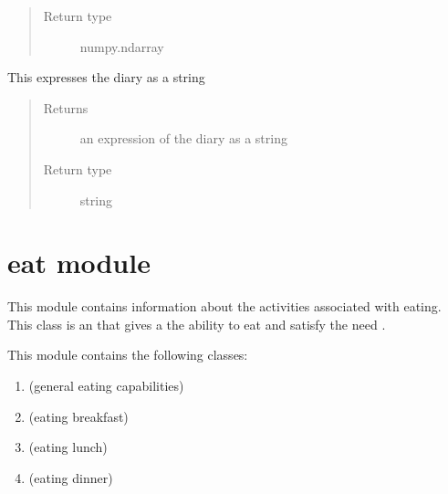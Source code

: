 \documentclass[letterpaper,10pt,english]{sphinxmanual}
\begin{document}
\begin{fulllineitems}
\begin{fulllineitems}
\begin{quote}
\begin{description}
\item[{Return type}] \leavevmode
numpy.ndarray

\end{description}\end{quote}

\end{fulllineitems}


\begin{fulllineitems}
\label{diary:diary.Diary.toString}
This expresses the diary as a string
\begin{quote}\begin{description}
\item[{Returns}] \leavevmode
an expression of the diary as a string

\item[{Return type}] \leavevmode
string

\end{description}\end{quote}

\end{fulllineitems}


\end{fulllineitems}



\section{eat module}
\label{eat::doc}\label{eat:eat-module}\label{eat:module-eat}
This module contains information about the activities associated with eating. This class is an {\hyperref[activity:activity.Activity]{\emph{}}} that gives a {\hyperref[person:person.Person]{\emph{}}} the ability to eat and satisfy the need {\hyperref[hunger:hunger.Hunger]{\emph{}}}.

This module contains the following classes:
\begin{enumerate}
\item {} 
{\hyperref[eat:eat.Eat]{\emph{}}} (general eating capabilities)

\item {} 
{\hyperref[eat:eat.Eat_Breakfast]{\emph{}}} (eating breakfast)

\item {} 
{\hyperref[eat:eat.Eat_Lunch]{\emph{}}} (eating lunch)

\item {} 
{\hyperref[eat:eat.Eat_Dinner]{\emph{}}} (eating dinner)

\end{enumerate}
\end{document}
